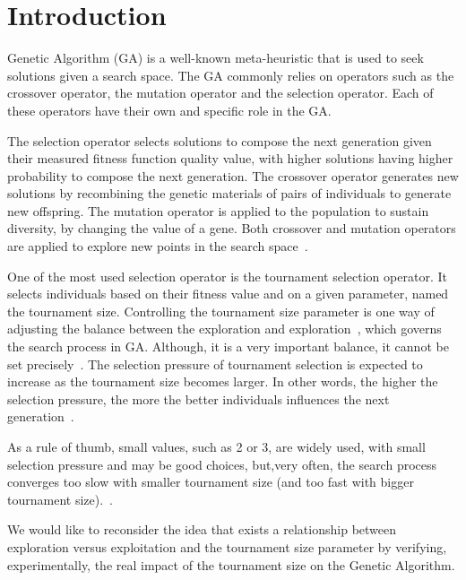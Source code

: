 \section{Introduction}\label{intro}

 Genetic Algorithm (GA) is a well-known meta-heuristic that is used to seek solutions given a search space. The GA commonly relies on operators such as the crossover operator, the mutation operator and the selection operator. Each of these operators have their own and specific role in the GA.
 
  The selection operator selects solutions to compose the next generation given their measured fitness function quality value, with higher solutions having higher probability to compose the next generation. The crossover operator generates new solutions by recombining the genetic materials of pairs of individuals to generate new offspring. The mutation operator is applied to the population to sustain diversity, by changing the value of a gene. Both crossover and mutation operators are applied to explore new points in the search space~\cite{blickle1995mathematical}.

One of the most used selection operator is the tournament selection operator. It selects individuals based on their fitness value and on a given parameter, named the tournament size. Controlling the tournament size parameter is one way of adjusting the balance between the exploration and exploration~\cite{blickle1995mathematical}, which governs the search process in GA. Although, it is a very important balance, it cannot be set precisely~\cite{filipovic2012fine}. The selection pressure of tournament selection is expected to increase as the tournament size becomes larger. In other words, the higher the selection pressure, the more the better individuals influences the next generation~\cite{miller1995genetic}. 

As a rule of thumb, small values, such as 2 or 3, are widely used, with small selection pressure and may be good choices, but,very often, the search process converges too slow with smaller tournament size (and too fast with bigger tournament size).~\cite{filipovic2012fine}.

 
 We would like to reconsider the idea that exists a relationship between exploration versus exploitation and the tournament size parameter by verifying, experimentally, the real impact of the tournament size on the Genetic Algorithm.
 
